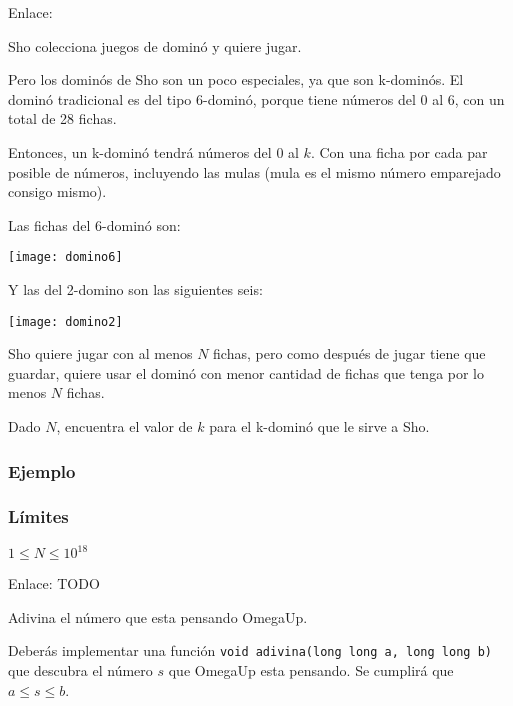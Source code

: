Enlace: 



\problembreak

\problemtitle Sho colecciona juegos de dominó y quiere jugar.

Pero los dominós de Sho son un poco especiales, ya que son k-dominós. El dominó tradicional es del tipo 6-dominó, porque tiene números del \(0\) al \(6\), con un total de 28 fichas.

Entonces, un k-dominó tendrá números del \(0\) al \(k\). Con una ficha por cada par posible de números, incluyendo las mulas (mula es el mismo número emparejado consigo mismo).

Las fichas del 6-dominó son:

\begin{center}
		\texttt{[image: domino6]}
\end{center}

Y las del 2-domino son las siguientes seis:
\begin{center}
	\texttt{[image: domino2]}
\end{center}

Sho quiere jugar con al menos \(N\) fichas, pero como después de jugar tiene que guardar, quiere usar el dominó con menor cantidad de fichas que tenga por lo menos \(N\) fichas. 

Dado \(N\), encuentra el valor de \(k\) para el k-dominó que le sirve a Sho.

\subsubsection*{Ejemplo}
\begin{casebox2}
\end{casebox2}

\subsubsection*{Límites}
\begin{plimits}
	\item \(1\leq N \leq 10^{18}\)
\end{plimits}

Enlace: TODO

\problembreak

\problemtitle Adivina el número que esta pensando OmegaUp.

Deberás implementar una función \verb|void adivina(long long a, long long b)| que descubra el número \(s\) que OmegaUp esta pensando. Se cumplirá que \(a\leq s\leq b\).


